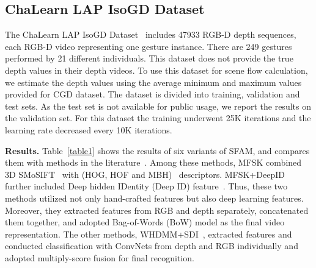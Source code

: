 \documentclass[10pt,twocolumn,letterpaper]{article}
\begin{document}
\subsection{ChaLearn LAP IsoGD Dataset} The ChaLearn LAP IsoGD 
Dataset~\cite{wanchalearn} includes 
47933 RGB-D depth sequences, each RGB-D video representing one gesture instance. 
There are 249 gestures performed by 21 different individuals. This dataset does 
not provide the true depth values in their depth videos. To use this dataset for 
scene flow calculation, we estimate the depth values using the average minimum 
and maximum values provided for CGD dataset.  The dataset is divided into 
training, validation and test sets. As the test set is not available 
for public usage, we report the results on the validation set. For this dataset 
the training underwent 25K iterations and the learning rate decreased every 10K 
iterations.

\textbf{Results.} Table~\ref{table1} shows the results of six variants of 
SFAM, 
and compares them with methods in the 
literature~\cite{pami16Jun,wanchalearn,bilen2016dynamic,pichaoTHMS}. Among these 
methods, MFSK combined 3D SMoSIFT~\cite{wan20143d} with (HOG, HOF and 
MBH)~\cite{wang2013action} descriptors.  MFSK+DeepID further included Deep 
hidden IDentity (Deep ID) feature~\cite{sun2014deep}. Thus, these two methods 
utilized not only hand-crafted features but also deep learning features. 
Moreover, they extracted features from RGB and depth separately, 
concatenated them together, and adopted Bag-of-Words (BoW) model as the final 
video representation. The other methods, 
WHDMM+SDI~\cite{pichaoTHMS,bilen2016dynamic}, extracted features and conducted 
classification with ConvNets from depth and RGB individually and adopted 
multiply-score fusion for final recognition.
\end{document}
